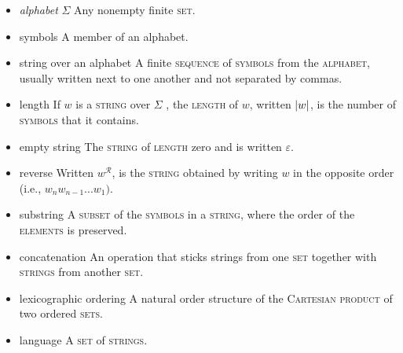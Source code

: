 \documentclass{article}
\newcommand{\term}[1]{\textsc{#1}}
\begin{document}
\bigskip \indent
\begin{itemize}
\item \emph{alphabet} $\Sigma$
  \subitem Any nonempty finite \term{set}.
\item symbols
   \subitem A member of an alphabet.

\item string over an alphabet
   \subitem A finite \term{sequence} of \term{symbols} from the \term{alphabet}, usually written next to one another and not separated by commas.

\item length 
   \subitem If  $w$ is a \term{string} over  $\Sigma$ , the \term{length} of $w$, written $\abs{w}$, is the number of \term{symbols} that it contains.

\item empty string 
   \subitem The \term{string} of \term{length} zero and is written $\varepsilon$.

\item reverse
   \subitem Written $w^\mathcal{R}$, is the \term{string} obtained by writing $w$ in the opposite order (i.e., $w_{n}w_{n-1}...w_{1}).$

\item substring
   \subitem A \term{subset} of the \term{symbols} in a \term{string}, where the order of the \term{elements} is preserved.
   
\item concatenation
   \subitem An operation that sticks strings from one \term{set} together with \term{strings} from another \term{set}. 

\item lexicographic ordering
   \subitem A natural order structure of the \term{Cartesian product} of two ordered \term{sets}.

\item language
  \subitem A \term{set} of \term{strings}.

\end{itemize}
\end{document}
